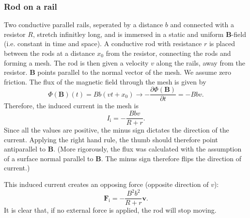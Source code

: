 \documentclass[a4paper, 12pt]{article}
\renewcommand{\vec}[1]{\bm{#1}}
\newcommand{\B}{\ensuremath{\vec{B}}}
\begin{document}
        \subsubsection{Rod on a rail}
            Two conductive parallel rails, seperated by a distance $b$ and connected with a resistor $R$, stretch infinitley long, 
            and is immersed in a static and uniform \B-field (i.e. constant in time and space). 
            A conductive rod with resistance $r$ is placed between the rods at a distance $x_0$ from the resistor, 
            connecting the rods and forming a mesh. The rod is then given a velocity $v$ along the rails, away from the resistor.
            \B{} points parallel to the normal vector of the mesh. We assume zero friction. 
            The flux of the magnetic field through the mesh is given by
            \begin{equation}
                \Phi(\B)(t) = Bb(vt+x_0) \rightarrow -\frac{\partial \Phi(\B)}{\partial t} = -Bbv.
            \end{equation}
            Therefore, the induced current in the mesh is
            \begin{equation}
                I_\text{i} = -\frac{Bbv}{R+r}.
            \end{equation}
            Since all the values are positive, the minus sign dictates the direction of the current. Applying the right hand rule,
            the thumb should therefore point antiparallel to \B. 
            (More rigorously, the flux was calculated with the assumption of a surface normal parallel to \B. 
            The minus sign therefore flips the direction of current.)

            This induced current creates an opposing force (opposite direction of $v$): 
            \begin{equation}
                \vec{F}_\text{i} = -\frac{B^2b^2}{R+r}\vec{v}.
            \end{equation}
            It is clear that, if no external force is applied, the rod will stop moving.
\end{document}
